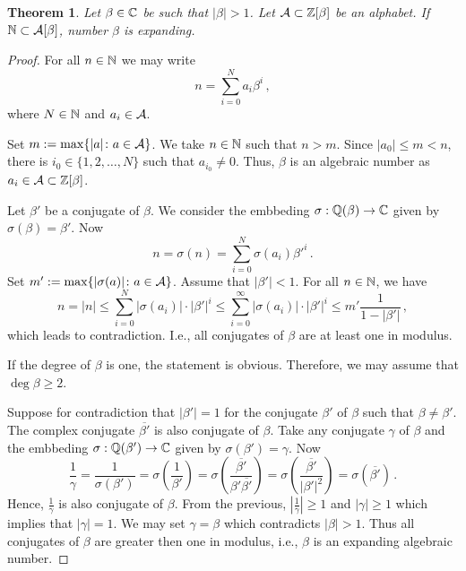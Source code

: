 \documentclass{article}
\newtheorem{theo}{Theorem}
\newtheorem{lem}[theo]{Lemma}
\begin{document}




\begin{theo}
\label{thm:betaExpanding}
    Let $\beta \in \mathbb{C}$ be such that $|\beta|>1$. Let $\mathcal{A}\subset \mathbb{Z}[\beta]$ be an alphabet. If $\mathbb{N}\subset \mathcal{A}[\beta]$, number $\beta$ is expanding.
\end{theo}
\begin{proof}
For all $n\in\mathbb{N}$ we may write 
    $$
    n=\sum_{i=0}^{N}a_i\beta^i\,,
    $$
    where $N\in\mathbb{N}$ and $a_i\in\mathcal{A}$.
    
    Set $m:= \max\{|a|\colon a\in\mathcal{A}\}$. We take $n\in\mathbb{N}$ such that $n>m$. 
    Since $|a_0|\leq m<n$, there is $i_0 \in \{1,2,\dots,N\}$ such that $a_{i_0}\neq 0$. Thus, $\beta$ is an algebraic number as $a_i\in\mathcal{A}\subset\mathbb{Z}[\beta]$.
    
    Let $\beta'$ be a conjugate of $\beta$.  
    We consider the embbeding $\sigma: \mathbb{Q}(\beta)\rightarrow \mathbb{C}$ given by $\sigma(\beta)=\beta'$. Now 
    $$
    n=\sigma(n)=\sum_{i=0}^{N}\sigma(a_i)\beta'^i\,.
    $$
    Set $m':= \max\{|\sigma(a)|\colon a\in\mathcal{A}\}$.  Assume that $|\beta'|<1$. For all $n\in\mathbb{N}$, we have 
    $$
    n=|n|\leq\sum_{i=0}^{N}|\sigma(a_i)|\cdot|\beta'|^i \leq \sum_{i=0}^{\infty}|\sigma(a_i)|\cdot|\beta'|^i \leq m'\frac{1}{1-|\beta'|}\,,  
    $$
    which leads to contradiction. I.e., all conjugates of $\beta$ are at least one in modulus.
    
    If the degree of $\beta$ is one, the statement is obvious.  Therefore, we may assume that $\deg \beta \geq 2$. 
    
    Suppose  for contradiction that $|\beta'|=1$ for the conjugate $\beta'$  of $\beta$ such that $\beta\neq\beta'$. The complex conjugate $\overline{\beta'}$ is also conjugate of $\beta$. Take any conjugate $\gamma$ of $\beta$ and the embbeding $\sigma: \mathbb{Q}(\beta')\rightarrow \mathbb{C}$ given by $\sigma(\beta')=\gamma$.
    Now
    $$
    \frac{1}{\gamma}=\frac{1}{\sigma(\beta')}=\sigma\left(\frac{1}{\beta'}\right)=\sigma\left(\frac{\overline{\beta'}}{\beta'\overline{\beta'}}\right)=\sigma\left(\frac{\overline{\beta'}}{|\beta'|^2}\right)=\sigma(\overline{\beta'})\,.
    $$
    Hence, $\frac{1}{\gamma}$ is also conjugate of $\beta$. From the previous, $\left|\frac{1}{\gamma}\right|\geq 1$ and $|\gamma|\geq 1$ which implies that $|\gamma|=1$. We may set $\gamma=\beta$ which contradicts $|\beta|>1$. Thus all conjugates of $\beta$ are greater then one in modulus, i.e., $\beta$ is an expanding algebraic number.
\end{proof}
\end{document}
